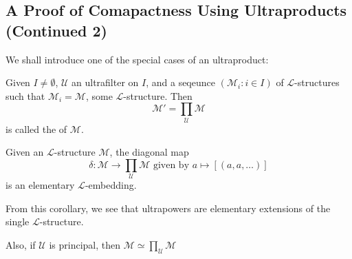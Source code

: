 \documentclass[notoc,notitlepage]{tufte-book}
\begin{document}
\subsection{A Proof of Comapactness Using Ultraproducts (Continued 2)}%
\label{sub:a_proof_of_comapactness_using_ultraproducts_continued_2}

We shall introduce one of the special cases of an ultraproduct:

\begin{defn}[Ultrapower]\label{defn:ultrapower}
  Given $I \neq \emptyset$, $\mathcal{U}$ an ultrafilter on $I$, and a seqeunce $(\mathcal{M}_i : i \in I)$ of $\mathcal{L}$-structures such that $\mathcal{M}_i = \mathcal{M}$, some $\mathcal{L}$-structure. Then
  \begin{equation*}
    \mathcal{M}' = \prod_{\mathcal{U}} \mathcal{M}
  \end{equation*}
  is called the  of $\mathcal{M}$.
\end{defn}

\begin{crly}[Corollary of {\L}o\'{s}]\label{crly:corollary_of_los}
  Given an $\mathcal{L}$-structure $\mathcal{M}$, the diagonal map
  \begin{equation*}
    \delta : \mathcal{M} \to \prod_{\mathcal{U}} \mathcal{M} \text{ given by } a \mapsto [(a, a, \ldots)]
  \end{equation*}
  is an elementary $\mathcal{L}$-embedding.
\end{crly}

\begin{note}
  From this corollary, we see that ultrapowers are elementary extensions of the single $\mathcal{L}$-structure.

  Also, if $\mathcal{U}$ is principal, then $\mathcal{M} \simeq \prod_{\mathcal{U}} \mathcal{M}$ 
\end{note}
\end{document}
